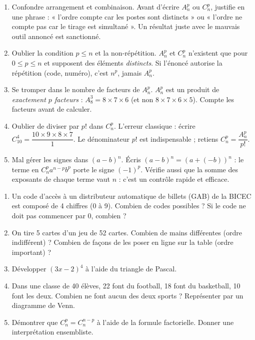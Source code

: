 \documentclass[11pt]{article}
\newcommand{\cle}[1]{{\popxbold\color{popdark}#1}}
\begin{document}
\begin{attention}
\begin{enumerate}
\item \cle{Confondre arrangement et combinaison.} Avant d'écrire $A_n^p$ ou $C_n^p$, justifie en une phrase : « l'ordre compte car les postes sont distincts » ou « l'ordre ne compte pas car le tirage est simultané ». Un résultat juste avec le mauvais outil annoncé est sanctionné.
\item \cle{Oublier la condition $p\le n$ et la non-répétition.} $A_n^p$ et $C_n^p$ n'existent que pour $0\le p\le n$ et supposent des éléments \emph{distincts}. Si l'énoncé autorise la répétition (code, numéro), c'est $n^p$, jamais $A_n^p$.
\item \cle{Se tromper dans le nombre de facteurs de $A_n^p$.} $A_n^p$ est un produit de \emph{exactement $p$ facteurs} : $A_8^3=8\times 7\times 6$ (et non $8\times 7\times 6\times 5$). Compte les facteurs avant de calculer.
\item \cle{Oublier de diviser par $p!$ dans $C_n^p$.} L'erreur classique : écrire $C_{10}^4=\dfrac{10\times 9\times 8\times 7}{1}$. Le dénominateur $p!$ est indispensable ; retiens $C_n^p=\dfrac{A_n^p}{p!}$.
\item \cle{Mal gérer les signes dans $(a-b)^n$.} Écris $(a-b)^n=(a+(-b))^n$ : le terme en $C_n^p a^{n-p}b^p$ porte le signe $(-1)^p$. Vérifie aussi que la somme des exposants de chaque terme vaut $n$ : c'est un contrôle rapide et efficace.
\end{enumerate}
\end{attention}

\begin{exercice}
\begin{enumerate}
\item Un code d'accès à un distributeur automatique de billets (GAB) de la BICEC est composé de 4 chiffres (0 à 9). Combien de codes possibles ? Si le code ne doit pas commencer par 0, combien ?
\item On tire 5 cartes d'un jeu de 52 cartes. Combien de mains différentes (ordre indifférent) ? Combien de façons de les poser en ligne sur la table (ordre important) ?
\item Développer $(3x-2)^4$ à l'aide du triangle de Pascal.
\item Dans une classe de 40 élèves, 22 font du football, 18 font du basketball, 10 font les deux. Combien ne font aucun des deux sports ? Représenter par un diagramme de Venn.
\item Démontrer que $C_n^p = C_n^{n-p}$ à l'aide de la formule factorielle. Donner une interprétation ensembliste.
\end{enumerate}
\end{exercice}
\end{document}
